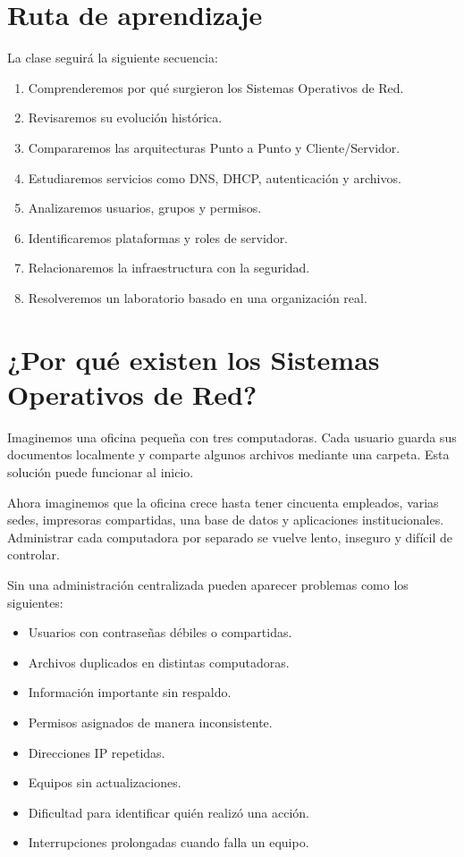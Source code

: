 \documentclass[
  spanish,
  letterpaper,
]{scrbook}
\providecommand{\tightlist}{%
  \setlength{\itemsep}{0pt}\setlength{\parskip}{0pt}}
\begin{document}

\chapter{Ruta de aprendizaje}\label{ruta-de-aprendizaje}

La clase seguirá la siguiente secuencia:

\begin{enumerate}
\def\labelenumi{\arabic{enumi}.}
\tightlist
\item
  Comprenderemos por qué surgieron los Sistemas Operativos de Red.
\item
  Revisaremos su evolución histórica.
\item
  Compararemos las arquitecturas Punto a Punto y Cliente/Servidor.
\item
  Estudiaremos servicios como DNS, DHCP, autenticación y archivos.
\item
  Analizaremos usuarios, grupos y permisos.
\item
  Identificaremos plataformas y roles de servidor.
\item
  Relacionaremos la infraestructura con la seguridad.
\item
  Resolveremos un laboratorio basado en una organización real.
\end{enumerate}


\chapter{¿Por qué existen los Sistemas Operativos de
Red?}\label{por-quuxe9-existen-los-sistemas-operativos-de-red}

Imaginemos una oficina pequeña con tres computadoras. Cada usuario
guarda sus documentos localmente y comparte algunos archivos mediante
una carpeta. Esta solución puede funcionar al inicio.

Ahora imaginemos que la oficina crece hasta tener cincuenta empleados,
varias sedes, impresoras compartidas, una base de datos y aplicaciones
institucionales. Administrar cada computadora por separado se vuelve
lento, inseguro y difícil de controlar.

Sin una administración centralizada pueden aparecer problemas como los
siguientes:

\begin{itemize}
\tightlist
\item
  Usuarios con contraseñas débiles o compartidas.
\item
  Archivos duplicados en distintas computadoras.
\item
  Información importante sin respaldo.
\item
  Permisos asignados de manera inconsistente.
\item
  Direcciones IP repetidas.
\item
  Equipos sin actualizaciones.
\item
  Dificultad para identificar quién realizó una acción.
\item
  Interrupciones prolongadas cuando falla un equipo.
\end{itemize}
\end{document}
